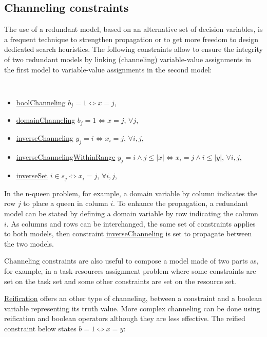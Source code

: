 \subsection{Channeling constraints}\label{model:channelingconstraints}\hypertarget{model:channelingconstraints}{}
The use of a redundant model, based on an alternative set of decision variables, is a frequent technique to strengthen propagation or to get more freedom to design dedicated search heuristics. 
The following constraints allow to ensure the integrity of two redundant models by linking (channeling) variable-value assignments in the first model to variable-value assignments in the second model:
\begin{notedef}\tt
  \begin{itemize}
  \item \hyperlink{boolchanneling:boolchannelingconstraint}{boolChanneling} $b_j=1 \iff x=j$, 
  \item \hyperlink{domainchanneling:domainchannelingconstraint}{domainChanneling} $b_j=1 \iff x=j$, $\forall j$, 
  \item \hyperlink{inversechanneling:inversechannelingconstraint}{inverseChanneling} $y_j=i \iff x_i=j$, $\forall i, j$, 
  \item \hyperlink{inversechannelingwithinrange:inversechannelingconstraintwithinrange}{inverseChannelingWithinRange} $y_j=i \wedge j \le |x| \iff x_i=j \wedge i \le |y|$, $\forall i, j$, 
  \item \hyperlink{inverseset:inversesetconstraint}{inverseSet} $i\in s_j \iff x_i=j$, $\forall i,j$, 
  \end{itemize}
\end{notedef}
In the n-queen problem, for example, a domain variable by column indicates the row $j$ to place a queen in column $i$. To enhance the propagation, a redundant model can be stated by defining a domain variable by row indicating the column $i$. As columns and rows can be interchanged, the same set of constraints applies to both models, then constraint \hyperlink{inversechanneling:inversechannelingconstraint}{inverseChanneling} is set to propagate between the two models.


Channeling constraints are also useful to compose a model made of two parts as, for example, in a task-resources assignment problem where some constraints are set on the task set and some other constraints are set on the resource set.

\hyperlink{model:reifiedconstraints}{Reification} offers an other type of channeling, between a constraint and a boolean variable representing its truth value. 
More complex channeling can be done using reification and boolean operators although they are less effective. 
The reified constraint below states $b=1\iff x=y$:



